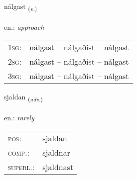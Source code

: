 \documentclass[frontgrid, backgrid]{flacards}\usepackage[]{graphicx}\usepackage[]{xcolor}
\begin{document}
\renewcommand{\flhead}{\vskip5pt \fboxsep=0pt {\small\bfseries\footnotesize Sagnorð | Verb}}
\renewcommand{\fcfoot}{\vskip5pt \fboxsep=0pt \hspace{2pt}{\small\bfseries\footnotesize 2K}}

\renewcommand{\blhead}{\vskip5pt {\small\bfseries\footnotesize Sagnorð | Verb }}
\renewcommand{\bcfoot}{\vskip5pt \hspace{2pt}{\small\bfseries\footnotesize 2K}}


{nálgast \small{\textsubscript{(\textit{v.})}} \\[1ex] %
\textphonetic{[naulkast]} \\
en.: \emph{approach} \\  [2ex]
\renewcommand*{\arraystretch}{0.8}
\begin{tabular}{p{1cm}l}
\textsc{1sg}: & nálgast -- nálgaðist -- nálgast \\ 
\textsc{2sg}: & nálgast -- nálgaðist -- nálgast \\ 
\textsc{3sg}: & nálgast -- nálgaðist -- nálgast \\ 
\end{tabular}
}

\renewcommand{\flhead}{\vskip5pt \fboxsep=0pt {\small\bfseries\footnotesize Atviksorð | Adverb}}
\renewcommand{\fcfoot}{\vskip5pt \fboxsep=0pt \hspace{2pt}{\small\bfseries\footnotesize 2K}}

\renewcommand{\blhead}{\vskip5pt {\small\bfseries\footnotesize Atviksorð | Adverb }}
\renewcommand{\bcfoot}{\vskip5pt \hspace{2pt}{\small\bfseries\footnotesize 2K}}


{sjaldan \small{\textsubscript{(\textit{adv.})}} \\[1ex] %
\textphonetic{[sjaltan]} \\
en.: \emph{rarely} \\  [2ex]
\renewcommand*{\arraystretch}{0.8}
\begin{tabular}{ll}
\textsc{pos}: & sjaldan \\ 
\textsc{comp.}: & sjaldnar \\ 
\textsc{superl.}: & sjaldnast \\
\end{tabular}
}
\end{document}
